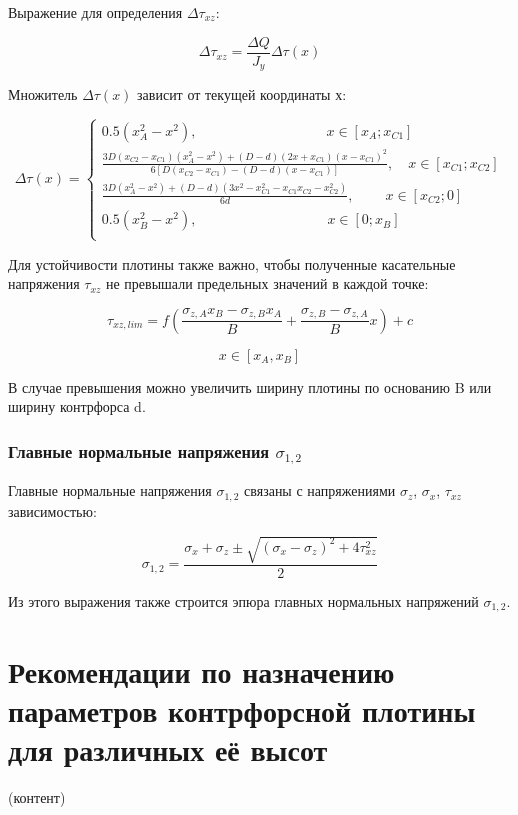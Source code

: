 \documentclass[12pt,a4paper,oneside,draft,titlepage]{article}
\begin{document}
Выражение для определения $\Delta \tau_{xz}$:

$$ \Delta \tau_{xz} = \frac{\Delta Q}{J_y} \Delta \tau (x) $$

Множитель $\Delta \tau (x)$ зависит от текущей координаты х:

$$ \Delta \tau (x) =
 \begin{cases}
 0.5  (x_A ^ 2 - x ^ 2), \qquad \qquad \qquad \qquad \quad \: x \in [x_A; x_{C1}]\\
 \frac{3D(x_{C2}-x_{C1})(x_A ^ 2 - x ^ 2)+(D-d)(2x+x_{C1})(x-x_{C1})^2}{6[D(x_{C2}-x_{C1})-(D-d)(x-x_{C1})]}, \quad  x \in [x_{C1}; x_{C2}]\\
 \frac{3D(x_A^2-x^2)+(D-d)(3x^2-x_{C1}^2-x_{C1}x_{C2}-x_{C2}^2)}{6 d}, \quad \quad \: x \in [x_{C2}; 0]\\
 0.5  (x_B ^ 2 - x ^ 2), \qquad \qquad \qquad \qquad \quad \; x \in [0; x_B]\\
 \end{cases}
$$

Для устойчивости плотины также важно, чтобы полученные касательные напряжения $\tau_{xz}$ не превышали предельных значений в каждой точке:

$$ \tau_{xz,lim} = f  (\frac{\sigma_{z,A}  x_B - \sigma_{z,B}  x_A}{  B} + \frac{\sigma_{z,B} - \sigma_{z,A} } {B} x) + c $$
 
$$ x \in [x_A, x_B] $$

В случае превышения можно увеличить ширину плотины по основанию
 B или ширину контрфорса d.

\section{Главные нормальные напряжения $\sigma_{1,2}$}

Главные нормальные напряжения $\sigma_{1,2}$ связаны с напряжениями $\sigma_z$, $\sigma_x$, $\tau_{xz}$ зависимостью:
 
$$ \sigma_{1,2} = \frac{\sigma_x + \sigma_z \pm \sqrt{(\sigma_x - \sigma_z) ^ 2 + 4  \tau_{xz} ^ 2}} {2} $$

Из этого выражения также строится эпюра главных нормальных напряжений $\sigma_{1,2}$.

\part{Рекомендации по назначению параметров контрфорсной плотины для различных её высот}

(контент)
\end{document}
